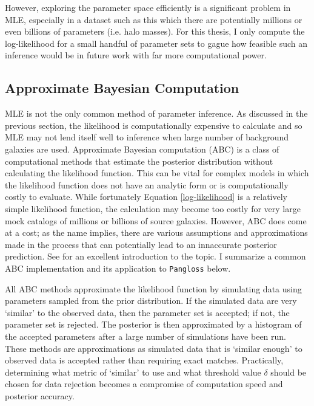 \documentclass[%
 reprint,
 amsmath,amssymb,
 aps,nofootinbib
]{revtex4-1}
\begin{document}
However, exploring the parameter space efficiently is a significant problem in MLE, especially in a dataset such as this which there are potentially millions or even billions of parameters (i.e. halo masses). For this thesis, I only compute the log-likelihood for a small handful of parameter sets to gague how feasible such an inference would be in future work with far more computational power.

\subsection{Approximate Bayesian Computation} \label{abc}

MLE is not the only common method of parameter inference. As discussed in the previous section, the likelihood is computationally expensive to calculate and so MLE may not lend itself well to inference when large number of background galaxies are used. Approximate Bayesian computation (ABC) is a class of computational methods that estimate the posterior distribution without calculating the likelihood function. This can be vital for complex models in which the likelihood function does not have an analytic form or is computationally costly to evaluate. While fortunately Equation \eqref{log-likelihood} is a relatively simple likelihood function, the calculation may become too costly for very large mock catalogs of millions or billions of source galaxies. However, ABC does come at a cost; as the name implies, there are various assumptions and approximations made in the process that can potentially lead to an innaccurate posterior prediction. See \cite{abc} for an excellent introduction to the topic. I summarize a common ABC implementation and its application to \texttt{Pangloss} below.

All ABC methods approximate the likelihood function by simulating data using parameters sampled from the prior distribution. If the simulated data are very `similar' to the observed data, then the parameter set is accepted; if not, the parameter set is rejected. The posterior is then approximated by a histogram of the accepted parameters after a large number of simulations have been run. These methods are approximations as simulated data that is `similar enough' to observed data is accepted rather than requiring exact matches. Practically, determining what metric of `similar' to use and what threshold value $\delta$ should be chosen for data rejection becomes a compromise of computation speed and posterior accuracy.
\end{document}
